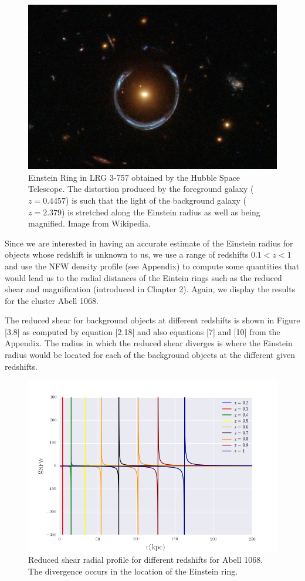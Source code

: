 \begin{figure}[H]
\centering
\includegraphics[width=12cm]{images/einstein_ring_wiki.jpg}
\caption[Einstein Ring in LRG 3-757]{Einstein Ring in LRG 3-757 obtained by the Hubble Space Telescope. The distortion produced by the foreground galaxy ($z=0.4457$) is such that the light of the background galaxy ($z=2.379$) is stretched along the Einstein radius as well as being magnified. Image from Wikipedia.}
\end{figure}

Since we are interested in having an accurate estimate of the Einstein radius for objects whose redshift is unknown to us, we use a range of redshifts  $0.1<z<1$ and use the NFW density profile (see Appendix) to compute some quantities that would lead us to the radial distances of the Eintein rings such as the reduced shear and magnification (introduced in Chapter 2). Again, we display the results for the cluster Abell 1068.

The reduced shear for background objects at different redshifts is shown in Figure [3.8] as computed by equation [2.18] and also equations [7] and [10] from the Appendix. The radius in which the reduced shear diverges is where the Einstein radius would be located for each of the background objects at the different given redshifts. 

\begin{figure}[H]
\centering
\includegraphics[width=12cm]{images/Reduced_Shear.png}
\caption[Reduced shear radial]{Reduced shear radial profile for different redshifts for Abell 1068. The divergence occurs in the location of the Einstein ring.}
\end{figure}


